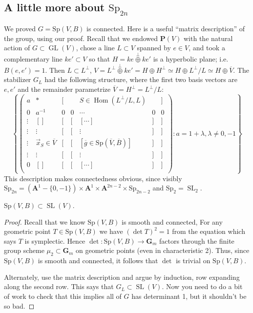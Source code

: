 \documentclass[10pt]{article}
\renewcommand{\AA}{\mathbf{A}}
\newcommand{\PP}{\mathbf{P}}
\newcommand{\GL}{\operatorname{GL}}
\newcommand{\SL}{\operatorname{SL}}
\newcommand{\Hom}{\operatorname{Hom}}
\renewcommand{\(}{\left(}
\renewcommand{\)}{\right)}
\renewcommand{\bar}{\overline}
\newcommand{\Sp}{\mathrm{Sp}}
\numberwithin{thm}{subsection}
\begin{document}
\subsection{A little more about $\Sp_{2n}$}
We proved $G=\Sp(V,B)$ is connected. Here is a useful ``matrix description'' of the group, using our proof.
Recall that we endowed $\PP(V)$ with the natural
action of $G\subset\GL(V)$, chose a line $L\subset V$ spanned by $e\in V$, 
and took a complementary line $ke'\subset V$
so that $H=ke\stackrel{\perp}{\oplus} ke'$ is a hyperbolic plane; i.e. $B(e,e')=1$. Then $L\subset L^\perp$,
$V=L^\perp\stackrel{\perp}{\oplus} ke'= H\oplus H^\perp \simeq H\oplus L^\perp/L
\simeq H\oplus \bar V$.
The stabilizer $G_L$ had the following structure, where the first two basis
vectors are $e,e'$ and the remainder parametrize $\bar V=H^\perp=L^\perp/L$:
\[\left\{\(\begin{array}{ccccccc}
a&*&[&&S\in \Hom(L^\perp/L,L)&&]\\
0&a^{-1}&0&0&\cdots&0&0\\
\vdots&[]&[&[&[\cdots]&]&]\\
\vdots&\vdots&[&[&\vdots&]&]\\
\vdots&\vec x_S\in \bar V&[&[&[\bar g \in \Sp(\bar V, \bar B)]&]&]\\
\vdots&\vdots&[&[&\vdots&]&]\\
0&[]&[&[&[\cdots]&]&]\\
\end{array}\):a=1+\lambda,\lambda\neq0,-1\right\}\]
This description makes connectedness obvious, since visibly
$\Sp_{2n}=(\AA^1-\{0,-1\})\times \AA^1\times \AA^{2n-2}\times\Sp_{2n-2}$
and $\Sp_2=\SL_2$.
\begin{cor}
$\Sp(V,B)\subset \SL(V)$.
\end{cor}
\begin{proof}
Recall that we know  $\Sp(V,B)$ is smooth and connected,
For any geometric point $T\in \Sp(V,B)$ we have $(\det T)^2=1$ from the equation which says $T$ is symplectic.
Hence $\det:\Sp(V,B)\to \mathbf{G}_m$ factors through the finite group scheme
$\mu_2\subset \mathbf{G}_m$ on geometric points (even in characteristic 2).
Thus, since $\Sp(V,B)$ is smooth and connected, it follows that $\det$ is trivial on $\Sp(V,B)$.

Alternately, use the matrix description and argue by induction,
row expanding along the second row.
This says that $G_L\subset \SL(V)$.
Now you need to do a bit of work to check that this implies all of $G$
has determinant 1, but it shouldn't be so bad.
\end{proof}
\end{document}
